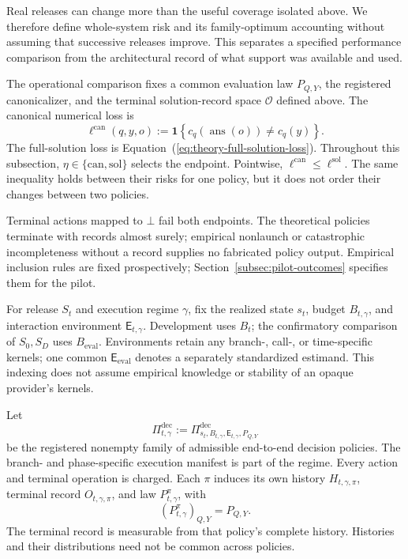 \documentclass[10pt]{article} %
\renewcommand{\eqref}[1]{\textup{(\ref{#1})}}
\providecommand{\1}{\mathbf{1}}  %
\theoremstyle{remark}
\theoremstyle{definition}
\begin{document}
Real releases can change more than the useful coverage isolated above.
We therefore define whole-system risk and its family-optimum accounting
without assuming that successive releases improve. This separates a
specified performance comparison from the architectural record of what
support was available and used.

The operational comparison fixes a common evaluation law $P_{Q,Y}$,
the registered canonicalizer, and the terminal solution-record space
$\mathcal O$ defined above. The canonical numerical loss is
\begin{equation}
\ell^{\mathrm{can}}(q,y,o)
:=
\mathbf 1\!\left\{
c_q\!\left(\operatorname{ans}(o)\right)\neq c_q(y)
\right\}.
\label{eq:versioned-canonical-loss}
\end{equation}
The full-solution loss is
Equation~\eqref{eq:theory-full-solution-loss}. Throughout this
subsection, $\eta\in\{\mathrm{can},\mathrm{sol}\}$ selects the endpoint.
Pointwise, $\ell^{\mathrm{can}}\leq\ell^{\mathrm{sol}}$. The same
inequality holds between their risks for one policy, but it does not
order their changes between two policies.

Terminal actions mapped to $\bot$ fail both endpoints. The theoretical
policies terminate with records almost surely; empirical nonlaunch or
catastrophic incompleteness without a record supplies no fabricated
policy output. Empirical inclusion rules are fixed prospectively;
Section~\ref{subsec:pilot-outcomes} specifies them for the pilot.

For release $S_t$ and execution regime $\gamma$, fix the realized state
$s_t$, budget $B_{t,\gamma}$, and interaction environment
$\mathsf E_{t,\gamma}$. Development uses $B_t$; the confirmatory
comparison of $S_0,S_D$ uses $B_{\mathrm{eval}}$. Environments retain
any branch-, call-, or time-specific kernels; one common
$\mathsf E_{\mathrm{eval}}$ denotes a separately standardized estimand.
This indexing does not assume empirical knowledge or stability of an
opaque provider's kernels.

Let
\begin{equation}
\Pi_{t,\gamma}^{\mathrm{dec}}
:=
\Pi_{s_t,B_{t,\gamma},\mathsf E_{t,\gamma},P_{Q,Y}}^{\mathrm{dec}}
\end{equation}
be the registered nonempty family of admissible end-to-end decision
policies. The branch- and phase-specific execution manifest is part
of the regime. Every action and terminal operation is charged.
Each $\pi$ induces its own history $H_{t,\gamma,\pi}$, terminal record
$O_{t,\gamma,\pi}$, and law $P_{t,\gamma}^{\pi}$, with
\[
\left(P_{t,\gamma}^{\pi}\right)_{Q,Y}=P_{Q,Y}.
\]
The terminal record is measurable from that policy's complete history.
Histories and their distributions need not be common across policies.
\end{document}
